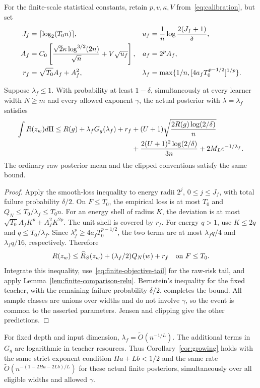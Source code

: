 For the finite-scale statistical constants, retain $p,v,\kappa,V$ from~\eqref{eq:calibration}, but set
\begin{align}
 J_f&=\lceil\log_2(T_0n)\rceil,&
 u_f&=\frac1n\log\frac{2(J_f+1)}\delta,\notag\\
 A_f&=C_0\left[\frac{\sqrt2\kappa\log^{3/2}(2n)}{\sqrt n}
                      +V\sqrt{u_f}\right],&
 a_f&=2^pA_f,\notag\\
 r_f&=\sqrt{T_0}A_f+A_f^2,&
 \lambda_f&=\max\{1/n,[4a_fT_0^{p-1/2}]^{1/p}\}.
 \label{eq:finite-positive-calibration}
\end{align}

\begin{theorem}
\label{thm:finite-upper-relu}
Suppose $\lambda_f\leq1$. With probability at least $1-\delta$, simultaneously at every learner width $N\geq m$ and every allowed exponent $\gamma$, the actual posterior with $\lambda=\lambda_f$ satisfies
\begin{align}
 \int R(z_w)d\Pi\leq R(g)+\lambda_fG_g(\lambda_f)+r_f
 &+(U+1)\sqrt{\frac{2R(g)\log(2/\delta)}n}\notag\\
 &+\frac{2(U+1)^2\log(2/\delta)}{3n}
              +2M_Le^{-1/\lambda_f}.
 \label{eq:finite-upper-relu}
\end{align}
The ordinary raw posterior mean and the clipped conventions satisfy the same bound.
\end{theorem}
\begin{proof}
Apply the smooth-loss inequality to energy radii $2^j$, $0\leq j\leq J_f$, with total failure probability $\delta/2$. On $F\leq T_0$, the empirical loss is at most $T_0$ and $Q_N\leq T_0/\lambda_f\leq T_0n$. For an energy shell of radius $K$, the deviation is at most
$\sqrt{T_0}A_fK^p+A_f^2K^{2p}$.
The unit shell is covered by $r_f$. For energy $q>1$, use $K\leq2q$ and $q\leq T_0/\lambda_f$. Since
$\lambda_f^p\geq4a_fT_0^{p-1/2}$, the two terms are at most $\lambda_fq/4$ and $\lambda_fq/16$, respectively. Therefore
\[
 R(z_w)\leq\widehat R_S(z_w)+(\lambda_f/2)Q_N(w)+r_f
 \quad\text{on }F\leq T_0.
\]
Integrate this inequality, use~\eqref{eq:finite-objective-tail} for the raw-risk tail, and apply Lemma~\ref{lem:finite-comparison-relu}. Bernstein's inequality for the fixed teacher, with the remaining failure probability $\delta/2$, completes the bound. All sample classes are unions over widths and do not involve $\gamma$, so the event is common to the asserted parameters. Jensen and clipping give the other predictions.
\end{proof}

For fixed depth and input dimension, $\lambda_f=\widetilde O(n^{-1/L})$. The additional terms in $G_g$ are logarithmic in teacher resources. Thus Corollary~\ref{cor:growing} holds with the same strict exponent condition $Ha+Lb<1/2$ and the same rate $\widetilde O(n^{-(1-2Ha-2Lb)/L})$ for these actual finite posteriors, simultaneously over all eligible widths and allowed $\gamma$.
